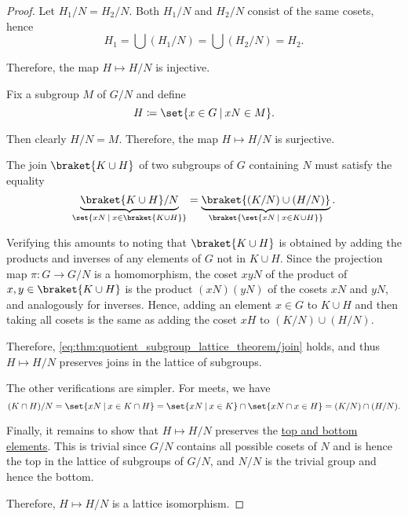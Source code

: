 \begin{proof}
   Let \( H_1 / N = H_2 / N \). Both \( H_1 / N \) and \( H_2 / N \) consist of the same cosets, hence
  \begin{equation*}
    H_1 = \bigcup (H_1 / N) = \bigcup (H_2 / N) = H_2.
  \end{equation*}

  Therefore, the map \( H \mapsto H / N \) is injective.

   Fix a subgroup \( M \) of \( G / N \) and define
  \begin{equation*}
    H \coloneqq \set{ x \in G \given xN \in M }.
  \end{equation*}

  Then clearly \( H / N = M \). Therefore, the map \( H \mapsto H / N \) is surjective.

   The join \( \braket{ K \cup H } \) of two subgroups of \( G \) containing \( N \) must satisfy the equality
  \begin{equation}\label{eq:thm:quotient_subgroup_lattice_theorem/join}
    \underbrace{ \braket{ K \cup H } / N }_{\set{ xN \given x \in \braket{ K \cup H } }}
    =
    \underbrace{ \braket{ (K / N) \cup (H / N) } }_{\braket{ \set{ xN \given x \in K \cup H } }}.
  \end{equation}

  Verifying this amounts to noting that \( \braket{ K \cup H } \) is obtained by adding the products and inverses of any elements of \( G \) not in \( K \cup H \). Since the projection map \( \pi: G \to G / N \) is a homomorphism, the coset \( xy N \) of the product of \( x, y \in \braket{ K \cup H } \) is the product \( (xN) (yN) \) of the cosets \( xN \) and \( yN \), and analogously for inverses. Hence, adding an element \( x \in G \) to \( K \cup H \) and then taking all cosets is the same as adding the coset \( xH \) to \( (K / N) \cup (H / N) \).

  Therefore, \eqref{eq:thm:quotient_subgroup_lattice_theorem/join} holds, and thus \( H \mapsto H / N \) preserves joins in the lattice of subgroups.

  The other verifications are simpler. For meets, we have
  \begin{equation*}
    (K \cap H) / N
    =
    \set{ xN \given x \in K \cap H }
    =
    \set{ xN \given x \in K } \cap \set{ xN \cap x \in H }
    =
    (K / N) \cap (H / N).
  \end{equation*}

  Finally, it remains to show that \( H \mapsto H / N \) preserves the \hyperref[def:extremal_points/top_and_bottom]{top and bottom elements}. This is trivial since \( G / N \) contains all possible cosets of \( N \) and is hence the top in the lattice of subgroups of \( G / N \), and \( N / N \) is the trivial group and hence the bottom.

  Therefore, \( H \mapsto H / N \) is a lattice isomorphism.
\end{proof}

